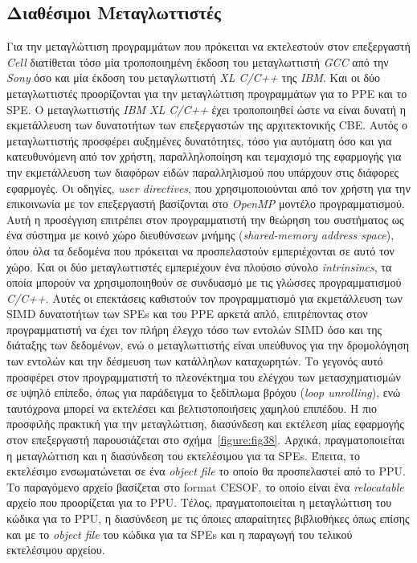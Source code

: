 \subsection[3.3.1 Διαθέσιμοι Μεταγλωττιστές]{Διαθέσιμοι Μεταγλωττιστές}
\label{subsection:sub331}
\indent
Για την μεταγλώττιση προγραμμάτων που πρόκειται να εκτελεστούν στον επεξεργαστή \textsl{Cell} διατίθεται τόσο μία τροποποιημένη έκδοση του μεταγλωττιστή \textsl{GCC} από την \textsl{Sony} όσο και μία έκδοση του μεταγλωττιστή \textsl{XL C/C++} της \textsl{IBM}. Και οι δύο μεταγλωττιστές προορίζονται για την μεταγλώττιση προγραμμάτων για το \ac{PPE} και το \ac{SPE}.\newline \indent
Ο μεταγλωττιστής \textsl{IBM XL C/C++} έχει τροποποιηθεί ώστε να είναι δυνατή η εκμετάλλευση των δυνατοτήτων των επεξεργαστών της αρχιτεκτονικής \ac{CBE}. Αυτός ο μεταγλωττιστής προσφέρει αυξημένες δυνατότητες, τόσο για αυτόματη όσο και για κατευθυνόμενη από τον χρήστη, παραλληλοποίηση και τεμαχισμό της εφαρμογής για την εκμετάλλευση των διαφόρων ειδών παραλληλισμού που υπάρχουν στις διάφορες εφαρμογές. Οι οδηγίες, \textsl{user directives}, που χρησιμοποιούνται από τον χρήστη για την επικοινωνία με τον επεξεργαστή βασίζονται στο \textsl{OpenMP} μοντέλο προγραμματισμού. Αυτή η προσέγγιση επιτρέπει στον προγραμματιστή την θεώρηση του συστήματος ως ένα σύστημα με κοινό χώρο διευθύνσεων μνήμης (\textsl{shared-memory address space}), όπου όλα τα δεδομένα που πρόκειται να προσπελαστούν εμπεριέχονται σε αυτό τον χώρο.\newline \indent
Και οι δύο μεταγλωττιστές εμπεριέχουν ένα πλούσιο σύνολο \textsl{intrinsincs}, τα οποία μπορούν να χρησιμοποιηθούν σε συνδυασμό με τις γλώσσες προγραμματισμού \textsl{C/C++}. Αυτές οι επεκτάσεις καθιστούν τον προγραμματισμό για εκμετάλλευση των \ac{SIMD} δυνατοτήτων των \acp{SPE} και του \ac{PPE} αρκετά απλό, επιτρέποντας στον προγραμματιστή να έχει τον πλήρη έλεγχο τόσο των εντολών \ac{SIMD} όσο και της διάταξης των δεδομένων, ενώ ο μεταγλωττιστής είναι υπεύθυνος για την δρομολόγηση των εντολών και την δέσμευση των κατάλληλων καταχωρητών. Το γεγονός αυτό προσφέρει στον προγραμματιστή το πλεονέκτημα του ελέγχου των μετασχηματισμών σε υψηλό επίπεδο, όπως για παράδειγμα το ξεδίπλωμα βρόχου (\textsl{loop unrolling}), ενώ ταυτόχρονα μπορεί να εκτελέσει και βελτιστοποιήσεις χαμηλού επιπέδου.\newline \indent
Η πιο προσφιλής πρακτική για την μεταγλώττιση, διασύνδεση και εκτέλεση μίας εφαρμογής στον επεξεργαστή παρουσιάζεται στο σχήμα~\ref{figure:fig38}. Αρχικά, πραγματοποιείται η μεταγλώττιση και η διασύνδεση του εκτελέσιμου για τα \acp{SPE}. Έπειτα, το εκτελέσιμο ενσωματώνεται σε ένα \textsl{object file} το οποίο θα προσπελαστεί από το \ac{PPU}. Το παραγόμενο αρχείο βασίζεται στο format \acf{CESOF}, το οποίο είναι ένα \textsl{relocatable} αρχείο που προορίζεται για το \ac{PPU}. Τέλος, πραγματοποιείται η μεταγλώττιση του κώδικα για το \ac{PPU}, η διασύνδεση με τις όποιες απαραίτητες βιβλιοθήκες όπως επίσης και με το \textsl{object file} του κώδικα για τα \acp{SPE} και η παραγωγή του τελικού εκτελέσιμου αρχείου.

